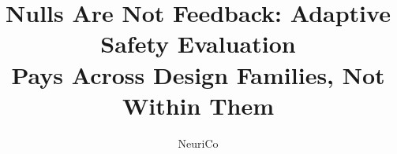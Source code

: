 \documentclass{article}
\title{Nulls Are Not Feedback: Adaptive Safety Evaluation\\
Pays Across Design Families, Not Within Them}
\author{NeuriCo}
\begin{document}
\maketitle

\begin{abstract}

\end{abstract}










\appendix

\end{document}
